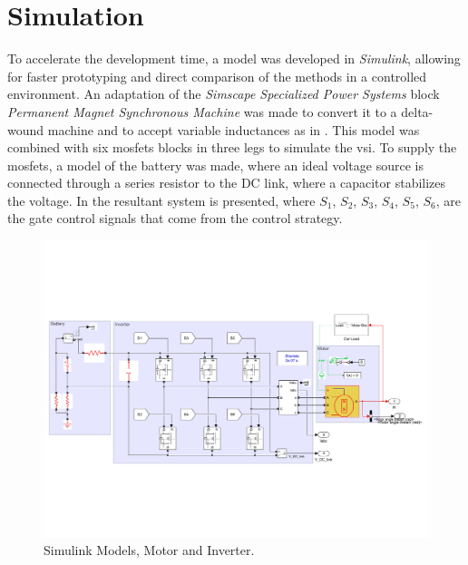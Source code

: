 
\section{Simulation}
\label{section:simulation}%
\vfill

To accelerate the development time, a model was developed in \textit{Simulink}, allowing for faster prototyping and direct comparison of the methods in a controlled environment. An adaptation of the \textit{Simscape Specialized Power Systems} block \textit{Permanent Magnet Synchronous Machine} was made to convert it to a delta-wound machine and to accept variable inductances as in . 
This model was combined with six \glspl{mosfet} blocks in three legs to simulate the \gls{vsi}. To supply the \glspl{mosfet}, a model of the battery was made, where an ideal voltage source is connected through a series resistor to the DC link, where a capacitor stabilizes the voltage. In  the resultant system is presented, where $S_1$, $S_2$, $S_3$, $S_4$, $S_5$, $S_6$, are the gate control signals that come from the control strategy.

\begin{figure}[!htb]
	\centering
		\includegraphics[clip, trim=0.3cm 5cm 0.5cm 5cm, width=1.00\textwidth]{Figures/motor_and_inverter_simulink1.pdf}
	\caption[Simulink Models, Motor and Inverter.]{Simulink Models, Motor and Inverter.}
	\label{fig:simulation_model} %
\end{figure}

